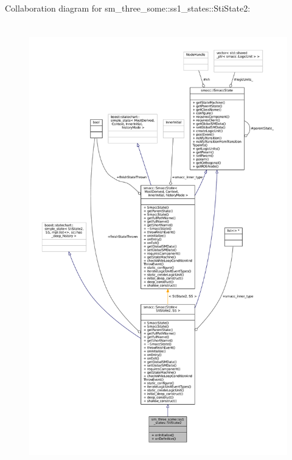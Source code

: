 Collaboration diagram for sm\+\_\+three\+\_\+some\+:\+:ss1\+\_\+states\+:\+:Sti\+State2\+:
\nopagebreak
\begin{figure}[H]
\begin{center}
\leavevmode
\includegraphics[height=550pt]{structsm__three__some_1_1ss1__states_1_1StiState2__coll__graph}
\end{center}
\end{figure}
